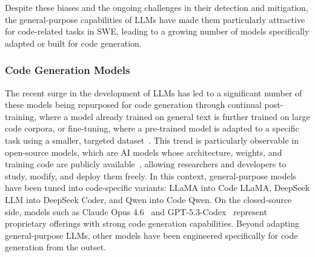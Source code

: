 \documentclass[
english,                 %
bibtex,                  %
includeExtraAbstracts, %
]{kththesis}
\numberwithin{listing}{chapter}
\begin{document}
Despite these biases and the ongoing challenges in their detection and mitigation, the general-purpose capabilities of \glspl{LLM} have made them particularly attractive for code-related tasks in \gls{SWE}, leading to a growing number of models specifically adapted or built for code generation.

\subsubsection{Code Generation Models}

The recent surge in the development of \glspl{LLM} has led to a significant number of these models being repurposed for code generation through continual post-training, where a model already trained on general text is further trained on large code corpora, or fine-tuning, where a pre-trained model is adapted to a specific task using a smaller, targeted dataset~\cite{jiang_survey_2026}. This trend is particularly observable in open-source models, which are AI models whose architecture, weights, and training code are publicly available~\cite{touvron_llama_2023}, allowing researchers and developers to study, modify, and deploy them freely. In this context, general-purpose models have been tuned into code-specific variants: \gls{LLaMA} into Code \gls{LLaMA}, DeepSeek \gls{LLM} into DeepSeek Coder, and Qwen into Code Qwen. On the closed-source side, models such as Claude Opus 4.6~\cite{anthropic_pbc_system_2026} and \gls{GPT}-5.3-Codex~\cite{openai_gpt-53-codex_2026} represent proprietary offerings with strong code generation capabilities. Beyond adapting general-purpose \glspl{LLM}, other models have been engineered specifically for code generation from the outset.
\end{document}
